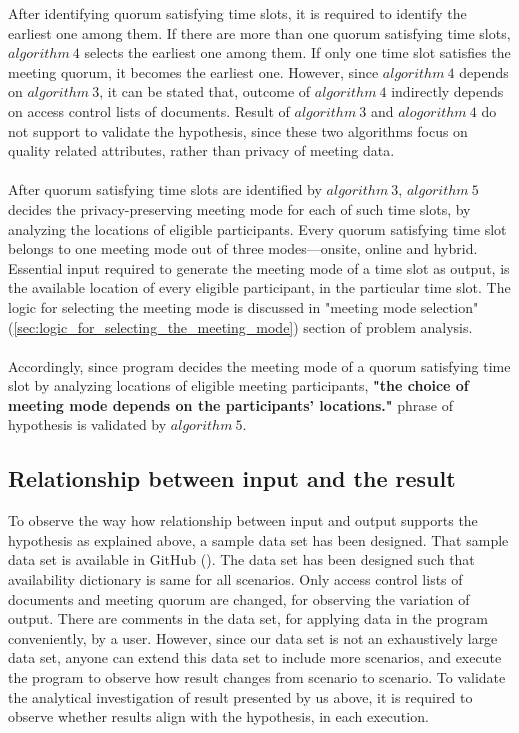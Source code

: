 After identifying quorum satisfying time slots, it is required to identify the earliest one among them. If there are more than one quorum satisfying time slots, $algorithm\ 4$ selects the earliest one among them. If only one time slot satisfies the meeting quorum, it becomes the earliest one. However, since $algorithm\ 4$ depends on $algorithm\ 3$, it can be stated that, outcome of $algorithm\ 4$ indirectly depends on access control lists of documents. Result of $algorithm\ 3$ and $alogorithm\ 4$ do not support to validate the hypothesis, since these two algorithms focus on quality related attributes, rather than privacy of meeting data. \\ \\
After quorum satisfying time slots are identified by $algorithm\ 3$, $algorithm\ 5$ decides the privacy-preserving meeting mode for each of such time slots, by analyzing the locations of eligible participants. Every quorum satisfying time slot belongs to one meeting mode out of three modes---onsite, online and hybrid. Essential input required to generate the meeting mode of a time slot as output, is the available location of every eligible participant, in the particular time slot. The logic for selecting the meeting mode is discussed in "meeting mode selection" (\ref{sec:logic_for_selecting_the_meeting_mode}) section of problem analysis. \\ \\
Accordingly, since program decides the meeting mode of a quorum satisfying time slot by analyzing locations of eligible meeting participants, \textbf{"the choice of meeting mode depends on the participants’ locations."} phrase of hypothesis is validated by $algorithm\ 5$.

\subsection{Relationship between input and the result}
To observe the way how relationship between input and output supports the hypothesis as explained above, a sample data set has been designed. That sample data set is available in GitHub (\cite{Thejana2025CircuitResultAnalysis}). The data set has been designed such that availability dictionary is same for all scenarios. Only access control lists of documents and meeting quorum are changed, for observing the variation of output. There are comments in the data set, for applying data in the program conveniently, by a user. However, since our data set is not an exhaustively large data set, anyone can extend this data set to include more scenarios, and execute the program to observe how result changes from scenario to scenario. To validate the analytical investigation of result presented by us above, it is required to observe whether results align with the hypothesis, in each execution. \\ \\


